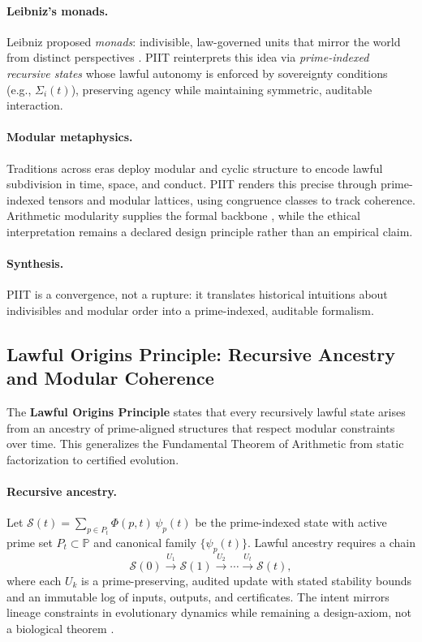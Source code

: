 \documentclass[12pt]{amsart}
\theoremstyle{plain}
\begin{document}
\paragraph{Leibniz’s monads.}
Leibniz proposed \emph{monads}: indivisible, law-governed units that mirror the world from distinct perspectives \cite{leibniz1989philosophical}. PIIT reinterprets this idea via \emph{prime-indexed recursive states} whose lawful autonomy is enforced by sovereignty conditions (e.g., $\Sigma_i(t)$), preserving agency while maintaining symmetric, auditable interaction.

\paragraph{Modular metaphysics.}
Traditions across eras deploy modular and cyclic structure to encode lawful subdivision in time, space, and conduct. PIIT renders this precise through prime-indexed tensors and modular lattices, using congruence classes to track coherence. Arithmetic modularity supplies the formal backbone \cite{hardy2008introduction}, while the ethical interpretation remains a declared design principle rather than an empirical claim.

\paragraph{Synthesis.}
PIIT is a convergence, not a rupture: it translates historical intuitions about indivisibles and modular order into a prime-indexed, auditable formalism.

\subsection{Lawful Origins Principle: Recursive Ancestry and Modular Coherence}

The \textbf{Lawful Origins Principle} states that every recursively lawful state arises from an ancestry of prime-aligned structures that respect modular constraints over time. This generalizes the Fundamental Theorem of Arithmetic from static factorization to certified evolution.

\paragraph{Recursive ancestry.}
Let $\mathcal{S}(t)=\sum_{p\in P_t}\Phi(p,t)\,\psi_p(t)$ be the prime-indexed state with active prime set $P_t\subset\mathbb{P}$ and canonical family $\{\psi_p(t)\}$. Lawful ancestry requires a chain
\[
\mathcal{S}(0)\xrightarrow{U_1}\mathcal{S}(1)\xrightarrow{U_2}\cdots\xrightarrow{U_t}\mathcal{S}(t),
\]
where each $U_k$ is a prime-preserving, audited update with stated stability bounds and an immutable log of inputs, outputs, and certificates. The intent mirrors lineage constraints in evolutionary dynamics while remaining a design-axiom, not a biological theorem \cite{maynard1982evolution}.
\end{document}
